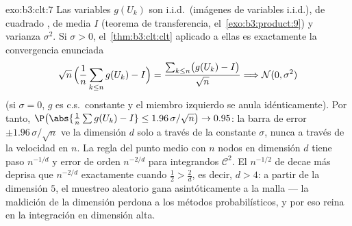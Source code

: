 \begin{solution}{exo:b3:clt:7}
Las variables $g(U_k)$ son i.i.d.\ (imágenes
 de variables i.i.d.),
de cuadrado , de media $I$
(teorema de transferencia, el~\cref{exo:b3:product:9}) y varianza
$\sigma^2$. Si $\sigma > 0$, el~\cref{thm:b3:clt:clt} aplicado a ellas
es exactamente la convergencia enunciada
\[
\sqrt n\,\Bigl(\frac1n\sum_{k\leq n}g(U_k) - I\Bigr) =
\frac{\sum_{k\leq n}\bigl(g(U_k) - I\bigr)}{\sqrt n}
\Longrightarrow \mathcal N(0, \sigma^2)
\]
(si $\sigma = 0$, $g$ es c.s.\ constante y el miembro izquierdo se anula
idénticamente). Por tanto, $\P\bigl(\abs{\frac1n\sum g(U_k) - I} \leq
1.96\,\sigma/\sqrt n\bigr) \to 0.95$: la barra de error $\pm
1.96\,\sigma/\sqrt n$ ve la dimensión $d$ solo a través de la constante
$\sigma$, nunca a través de la velocidad en $n$. La regla del punto
medio con $n$ nodos en dimensión $d$ tiene paso $n^{-1/d}$ y error de
orden $n^{-2/d}$ para integrandos $\mathcal C^2$. El $n^{-1/2}$ de
 decae más deprisa que
$n^{-2/d}$ exactamente cuando $\frac12 > \frac2d$, es decir, $d > 4$: a
partir de la dimensión $5$, el muestreo aleatorio gana asintóticamente a
la malla --- la maldición de la dimensión perdona a los métodos
probabilísticos, y por eso  reina en la integración en dimensión alta.
\end{solution}

